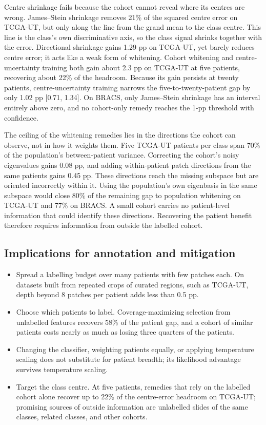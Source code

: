 \documentclass[11pt]{article}
\begin{document}
Centre shrinkage fails because the cohort cannot reveal where its centres are wrong. James--Stein shrinkage removes 21\% of the squared centre error on TCGA-UT, but only along the line from the grand mean to the class centre. This line is the class's own discriminative axis, so the class signal shrinks together with the error. Directional shrinkage gains 1.29 pp on TCGA-UT, yet barely reduces centre error; it acts like a weak form of whitening. Cohort whitening and centre-uncertainty training both gain about 2.3 pp on TCGA-UT at five patients, recovering about 22\% of the headroom. Because its gain persists at twenty patients, centre-uncertainty training narrows the five-to-twenty-patient gap by only 1.02 pp [0.71, 1.34]. On BRACS, only James--Stein shrinkage has an interval entirely above zero, and no cohort-only remedy reaches the 1-pp threshold with confidence.

The ceiling of the whitening remedies lies in the directions the cohort can observe, not in how it weights them. Five TCGA-UT patients per class span 70\% of the population's between-patient variance. Correcting the cohort's noisy eigenvalues gains 0.08 pp, and adding within-patient patch directions from the same patients gains 0.45 pp. These directions reach the missing subspace but are oriented incorrectly within it. Using the population's own eigenbasis in the same subspace would close 80\% of the remaining gap to population whitening on TCGA-UT and 77\% on BRACS. A small cohort carries no patient-level information that could identify these directions. Recovering the patient benefit therefore requires information from outside the labelled cohort.

\begin{samepage}
\section{Implications for annotation and mitigation}
\begin{itemize}\setlength{\itemsep}{1pt}
\item Spread a labelling budget over many patients with few patches each. On datasets built from repeated crops of curated regions, such as TCGA-UT, depth beyond 8 patches per patient adds less than 0.5 pp.
\item Choose which patients to label. Coverage-maximizing selection from unlabelled features recovers 58\% of the patient gap, and a cohort of similar patients costs nearly as much as losing three quarters of the patients.
\item Changing the classifier, weighting patients equally, or applying temperature scaling does not substitute for patient breadth; its likelihood advantage survives temperature scaling.
\item Target the class centre. At five patients, remedies that rely on the labelled cohort alone recover up to 22\% of the centre-error headroom on TCGA-UT; promising sources of outside information are unlabelled slides of the same classes, related classes, and other cohorts.
\end{itemize}
\end{samepage}
\end{document}
